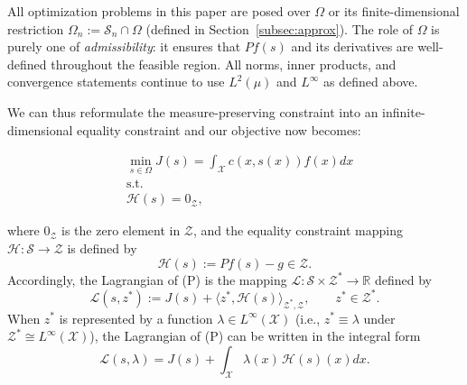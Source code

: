 \documentclass[12pt,leqno]{amsart}
\begin{document}
All optimization problems in this paper are posed over $\Omega$ or its finite-dimensional restriction $\Omega_n:=\mathcal{S}_n\cap\Omega$ (defined in Section~\ref{subsec:approx}). The role of $\Omega$ is purely one of \emph{admissibility}: it ensures that $Pf(s)$ and its derivatives are well-defined throughout the feasible region. All norms, inner products, and convergence statements continue to use $L^2(\mu)$ and $L^\infty$ as defined above.

We can thus reformulate the measure-preserving constraint into an infinite-dimensional equality constraint and our objective now becomes:

\begin{align*}
    &\min_{s\in\Omega} J(s)=\int_{\mathcal{X}} c(x, s(x))f(x)dx \tag{P}\\
    &\text{s.t.} \\
    & \mathcal{H}(s)=0_{\mathcal{Z}},
\end{align*}

where $0_{\mathcal{Z}}$ is the zero element in $\mathcal{Z}$, and the equality constraint mapping $\mathcal{H}:\mathcal{S}\to \mathcal{Z}$ is defined by
\[
\mathcal{H}(s) := Pf(s)-g \in \mathcal{Z}.
\]
Accordingly, the Lagrangian of (P) is the mapping $\mathcal{L}:\mathcal{S}\times \mathcal{Z}^*\to \mathbb R$ defined by \citep[cf.][{\S}9.3]{luenberger1969optimization}
\[
\mathcal{L}(s,z^*) := J(s) + \langle z^*,\mathcal{H}(s)\rangle_{\mathcal{Z}^*,\mathcal{Z}}, \qquad z^*\in \mathcal{Z}^*.
\]
When $z^*$ is represented by a function $\lambda\in L^\infty(\mathcal{X})$ (i.e., $z^*\equiv \lambda$ under $\mathcal{Z}^*\cong L^\infty(\mathcal{X})$), the Lagrangian of (P) can be written in the integral form
\[
\mathcal{L}(s,\lambda) = J(s) + \int_{\mathcal{X}} \lambda(x)\,\mathcal{H}(s)(x)dx.
\]
\end{document}
